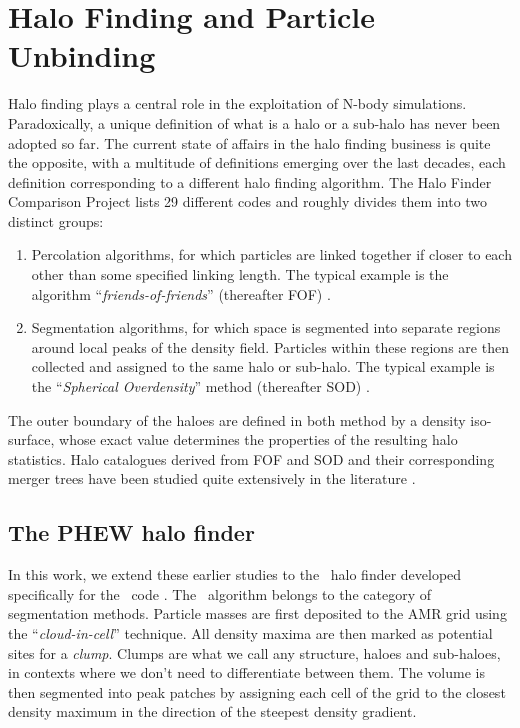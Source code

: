 \chapter{Halo Finding and Particle Unbinding}\label{chap:phew}

Halo finding plays a central role in the exploitation of N-body
simulations. Paradoxically, a unique definition of what is a halo or a
sub-halo has never been adopted so far.  The current state of affairs
in the halo finding business is quite the opposite, with a multitude
of definitions emerging over the last decades, each definition
corresponding to a different halo finding algorithm.  The Halo Finder
Comparison Project \citep{knebeHaloesGoneMAD2011} lists 29 different codes and roughly
divides them into two distinct groups:
\begin{enumerate}
\item Percolation algorithms, for which particles are linked together
  if closer to each other than some specified linking length. The
  typical example is the algorithm ``\emph{friends-of-friends}''
  (thereafter FOF) \citep{davisEvolutionLargescaleStructure1985}.
\item Segmentation algorithms, for which space is segmented into
  separate regions around local peaks of the density field. Particles
  within these regions are then collected and assigned to the same
  halo or sub-halo. The typical example is the ``\emph{Spherical
  Overdensity}'' method (thereafter SOD) \citep{pressFormationGalaxiesClusters1974}.
\end{enumerate}
The outer boundary of the haloes are defined in both method by a
density iso-surface, whose exact value determines the properties of
the resulting halo statistics.  Halo catalogues derived from FOF and
SOD and their corresponding merger trees have been studied quite
extensively in the literature \citep[see e.g.][]{SUSSING_HALOFINDER}.



\section{The PHEW halo finder}

In this work, we extend these earlier studies to the \phew\ halo
finder \citep{bleulerPHEWParallelSegmentation2015} developed specifically
for the \ramses\ code \citep{teyssierCosmologicalHydrodynamicsAdaptive2002}.
The \phew\ algorithm belongs to the category of
segmentation methods.  Particle masses are first deposited to the AMR
grid using the ``\emph{cloud-in-cell}'' technique. All density maxima
are then marked as potential sites for a \emph{clump}. Clumps are what
we call any structure, haloes and sub-haloes, in contexts where we
don't need to differentiate between them. The volume is then segmented
into peak patches by assigning each cell of the grid to the closest
density maximum in the direction of the steepest density gradient.

